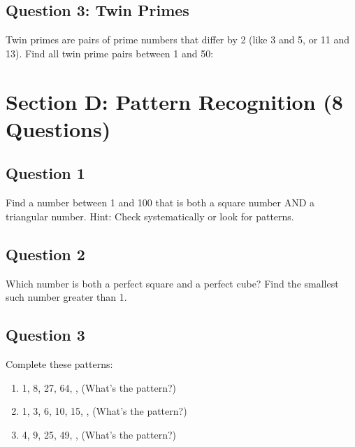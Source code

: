 \documentclass{article}
\begin{document}
\vspace{2cm}

\subsection*{Question 3: Twin Primes}
Twin primes are pairs of prime numbers that differ by 2 (like 3 and 5, or 11 and 13).
Find all twin prime pairs between 1 and 50:

\vspace{2cm}

\section{Section D: Pattern Recognition (8 Questions)}

\subsection*{Question 1}
Find a number between 1 and 100 that is both a square number AND a triangular number.
Hint: Check systematically or look for patterns.

\vspace{3cm}

\subsection*{Question 2}
Which number is both a perfect square and a perfect cube? Find the smallest such number greater than 1.

\vspace{2cm}

\subsection*{Question 3}
Complete these patterns:
\begin{enumerate}
    \item 1, 8, 27, 64, \underline{\hspace{1cm}}, \underline{\hspace{1cm}} (What's the pattern?)
    \item 1, 3, 6, 10, 15, \underline{\hspace{1cm}}, \underline{\hspace{1cm}} (What's the pattern?)
    \item 4, 9, 25, 49, \underline{\hspace{1cm}}, \underline{\hspace{1cm}} (What's the pattern?)
\end{enumerate}
\end{document}

